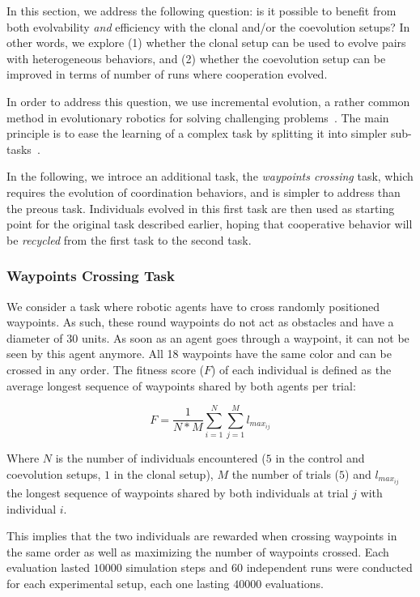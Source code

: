   In this section, we address the following question: is it possible to benefit from both evolvability \textit{and} efficiency with the clonal and/or the coevolution setups? In other words, we explore (1) whether the clonal setup can be used to evolve pairs with heterogeneous behaviors, and (2) whether the coevolution setup can be improved in terms of number of runs where cooperation evolved.

  In order to address this question, we use incremental evolution, a rather common method in evolutionary robotics for solving challenging problems~\cite{Dorigo1994,Saksida1997,Bongard2008,Doncieux2013}. The main principle is to ease the learning of a complex task by splitting it into simpler sub-tasks~\cite{Perkins1996}.

  In the following, we introce an additional task, the \textit{waypoints crossing} task, which requires the evolution of coordination behaviors, and is simpler to address than the preous task. Individuals evolved in this first task are then used as starting point for the original task described earlier, hoping that cooperative behavior will be \emph{recycled} from the first task to the second task.
  
  \subsubsection{Waypoints Crossing Task}  

  We consider a task where robotic agents have to cross randomly positioned waypoints. As such, these round waypoints do not act as obstacles and have a diameter of 30 units. As soon as an agent goes through a waypoint, it can not be seen by this agent anymore. All 18 waypoints have the same color and can be crossed in any order. The fitness score (\(F\)) of each individual is defined as the average longest sequence of waypoints shared by both agents per trial:

  \[
  F = \frac{1}{N*M} \sum_{i=1}^{N} \sum_{j=1}^{M} l_{max_{ij}}
  \]

  Where \(N\) is the number of individuals encountered ($5$ in the control and coevolution setups, $1$ in the clonal setup), \(M\) the number of trials ($5$) and \(l_{max_{ij}}\) the longest sequence of waypoints shared by both individuals at trial \(j\) with individual \(i\).

  This implies that the two individuals are rewarded when crossing waypoints in the same order as well as maximizing the number of waypoints crossed. Each evaluation lasted $10000$ simulation steps and $60$ independent runs were conducted for each experimental setup, each one lasting $40000$ evaluations.

